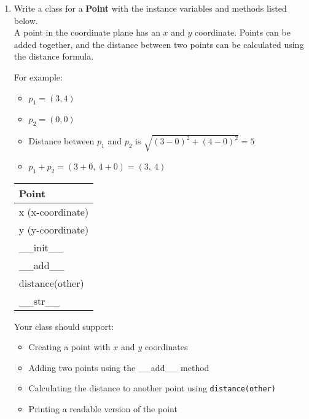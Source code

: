 \documentclass{article}
\begin{document}
\begin{enumerate}
	\item
		Write a class for a \textbf{Point} with the instance variables and methods listed below.\\
		A point in the coordinate plane has an $x$ and $y$ coordinate. Points can be added together, 
		and the distance between two points can be calculated using the distance formula.
			
		\begin{minipage}[t]{0.65\textwidth}
			For example:
			\begin{itemize}
				\item $p_1 = (3, 4)$
				\item $p_2 = (0, 0)$
				\item Distance between $p_1$ and $p_2$ is $\sqrt{(3 - 0)^2 + (4 - 0)^2} = 5$
				\item $p_1 + p_2 = (3 + 0,\ 4 + 0) = (3,\ 4)$
			\end{itemize}
		\end{minipage}
		\hfill
		\begin{minipage}[t]{0.32\textwidth}
			\vspace{.2em}
			\begin{flushright}
				\begin{tabular}{|l|}
					\hline
					Point \\ \hline
					x (x-coordinate) \\
					y (y-coordinate) \\ \hline
					\_\_init\_\_ \\
					\_\_add\_\_ \\
					distance(other) \\
					\_\_str\_\_ \\ \hline
				\end{tabular}
			\end{flushright}
		\end{minipage}
		
		Your class should support:
		\begin{itemize}
			\item Creating a point with $x$ and $y$ coordinates
			\item Adding two points using the \_\_add\_\_ method
			\item Calculating the distance to another point using \texttt{distance(other)}
			\item Printing a readable version of the point
		\end{itemize}
		

\end{enumerate}
\end{document}
